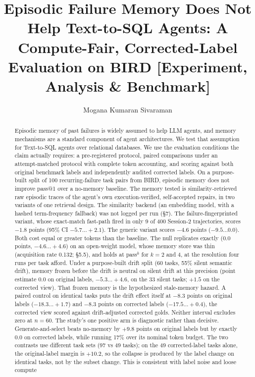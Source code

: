 \documentclass[sigconf, nonacm]{acmart}
\begin{document}
\title{Episodic Failure Memory Does Not Help Text-to-SQL Agents: A Compute-Fair, Corrected-Label Evaluation on BIRD [Experiment, Analysis \& Benchmark]}

\author{Mogana Kumaran Sivaraman}


\begin{abstract}
Episodic memory of past failures is widely assumed to help LLM agents, and memory mechanisms are a standard component of agent architectures. We test that assumption for Text-to-SQL agents over relational databases. We use the evaluation conditions the claim actually requires: a pre-registered protocol, paired comparisons under an attempt-matched protocol with complete token accounting, and scoring against both original benchmark labels and independently audited corrected labels. On a purpose-built split of 100 recurring-failure task pairs from BIRD, episodic memory does not improve pass@1 over a no-memory baseline. The memory tested is similarity-retrieved raw episodic traces of the agent's own execution-verified, self-accepted repairs, in two variants of one retrieval design. The similarity backend (an embedding model, with a hashed term-frequency fallback) was not logged per run (\S7). The failure-fingerprinted variant, whose exact-match fast-path fired in only 9 of 400 Session-2 trajectories, scores $-1.8$ points (95\% CI $-5.7\ldots+2.1$). The generic variant scores $-4.6$ points ($-9.5\ldots0.0$). Both cost equal or greater tokens than the baseline. The null replicates exactly (0.0 points, $-4.6\ldots+4.6$) on an open-weight model, whose memory store was thin (acquisition rate 0.132; \S5.5), and holds at pass$^k$ for $k = 2$ and 4, at the resolution four runs per task afford. Under a purpose-built drift split (60 tasks, 55\% silent semantic drift), memory frozen before the drift is neutral on silent drift at this precision (point estimate 0.0 on original labels, $-5.3\ldots+4.6$, on the 33 silent tasks; $+1.5$ on the corrected view). That frozen memory is the hypothesized stale-memory hazard. A paired control on identical tasks puts the drift effect itself at $-8.3$ points on original labels ($-18.3\ldots+1.7$) and $-8.3$ points on corrected labels ($-17.5\ldots+0.4$), the corrected view scored against drift-adjusted corrected golds. Neither interval excludes zero at $n = 60$. The study's one positive arm is diagnostic rather than decisive. Generate-and-select beats no-memory by $+9.8$ points on original labels but by exactly 0.0 on corrected labels, while running 17\% over its nominal token budget. The two contrasts use different task sets (97 vs 49 tasks); on the 49 corrected-label tasks alone, the original-label margin is $+10.2$, so the collapse is produced by the label change on identical tasks, not by the subset change. This is consistent with label noise and loose compute 
\end{abstract}
\end{document}
